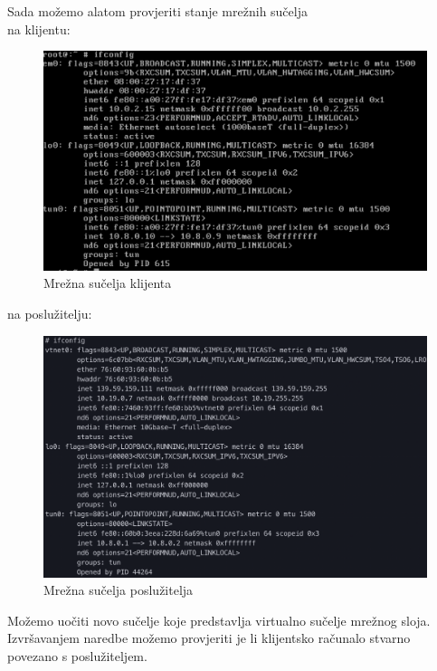         \noindent
        Sada možemo alatom  provjeriti stanje mrežnih sučelja \\
        na klijentu: \\
        \begin{figure}[H]
            \centering
            \includegraphics[scale=0.5]{slike/clientIfconfig}
            \caption{Mrežna sučelja klijenta }
        \end{figure}
        na poslužitelju: \\
        \begin{figure}[H]
            \centering
            \includegraphics[scale=0.5]{slike/serverIfconfig}
            \caption{Mrežna sučelja poslužitelja}
        \end{figure}

        Možemo uočiti novo sučelje  koje predstavlja virtualno
        sučelje mrežnog sloja. Izvršavanjem naredbe  možemo provjeriti je
        li klijentsko računalo stvarno povezano s poslužiteljem. \\

